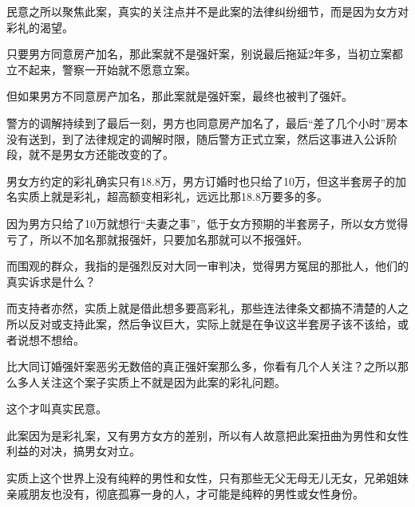 \documentclass[UTF8,11pt,oneside]{ctexart}
\begin{document}

民意之所以聚焦此案，真实的关注点并不是此案的法律纠纷细节，而是因为女方对彩礼的渴望。

只要男方同意房产加名，那此案就不是强奸案，别说最后拖延2年多，当初立案都立不起来，警察一开始就不愿意立案。

但如果男方不同意房产加名，那此案就是强奸案，最终也被判了强奸。

警方的调解持续到了最后一刻，男方也同意房产加名了，最后“差了几个小时”房本没有送到，到了法律规定的调解时限，随后警方正式立案，然后这事进入公诉阶段，就不是男女方还能改变的了。

男女方约定的彩礼确实只有18.8万，男方订婚时也只给了10万，但这半套房子的加名实质上就是彩礼，超高额变相彩礼，远远比那18.8万要多的多。

因为男方只给了10万就想行“夫妻之事”，低于女方预期的半套房子，所以女方觉得亏了，所以不加名那就报强奸，只要加名那就可以不报强奸。



而围观的群众，我指的是强烈反对大同一审判决，觉得男方冤屈的那批人，他们的真实诉求是什么？



而支持者亦然，实质上就是借此想多要高彩礼，那些连法律条文都搞不清楚的人之所以反对或支持此案，然后争议巨大，实际上就是在争议这半套房子该不该给，或者说想不想给。

比大同订婚强奸案恶劣无数倍的真正强奸案那么多，你看有几个人关注？之所以那么多人关注这个案子实质上不就是因为此案的彩礼问题。

这个才叫真实民意。


此案因为是彩礼案，又有男方女方的差别，所以有人故意把此案扭曲为男性和女性利益的对决，搞男女对立。

实质上这个世界上没有纯粹的男性和女性，只有那些无父无母无儿无女，兄弟姐妹亲戚朋友也没有，彻底孤寡一身的人，才可能是纯粹的男性或女性身份。

\end{document}
